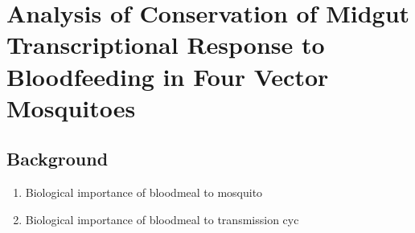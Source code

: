 \chapter{Analysis of Conservation of Midgut Transcriptional Response to Bloodfeeding in Four Vector Mosquitoes}

\section{Background}
\begin{enumerate}
 \item Biological importance of bloodmeal to mosquito
 \item Biological importance of bloodmeal to transmission cyc
\end{enumerate}



